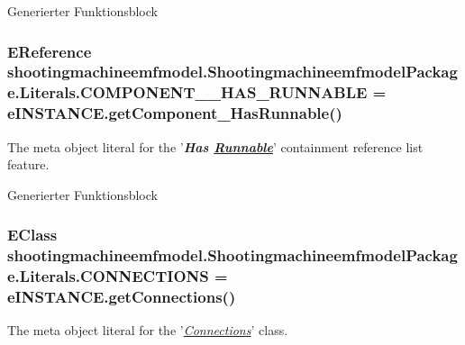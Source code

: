 Generierter Funktionsblock \hypertarget{interfaceshootingmachineemfmodel_1_1_shootingmachineemfmodel_package_1_1_literals_a20a06c9e56e70db80e097c0b1aa0a123}{
\subsubsection[{C\-O\-M\-P\-O\-N\-E\-N\-T\-\_\-\-\_\-\-H\-A\-S\-\_\-\-R\-U\-N\-N\-A\-B\-L\-E}]{\setlength{\rightskip}{0pt plus 5cm}E\-Reference shootingmachineemfmodel.\-Shootingmachineemfmodel\-Package.\-Literals.\-C\-O\-M\-P\-O\-N\-E\-N\-T\-\_\-\-\_\-\-H\-A\-S\-\_\-\-R\-U\-N\-N\-A\-B\-L\-E = e\-I\-N\-S\-T\-A\-N\-C\-E.\-get\-Component\-\_\-\-Has\-Runnable()}}\label{interfaceshootingmachineemfmodel_1_1_shootingmachineemfmodel_package_1_1_literals_a20a06c9e56e70db80e097c0b1aa0a123}
The meta object literal for the '{\itshape {\bfseries Has \hyperlink{interfaceshootingmachineemfmodel_1_1_runnable}{Runnable}}}' containment reference list feature.

Generierter Funktionsblock \hypertarget{interfaceshootingmachineemfmodel_1_1_shootingmachineemfmodel_package_1_1_literals_a9c8a1d573b9fd4d43bc01144a0a93f1f}{
\subsubsection[{C\-O\-N\-N\-E\-C\-T\-I\-O\-N\-S}]{\setlength{\rightskip}{0pt plus 5cm}E\-Class shootingmachineemfmodel.\-Shootingmachineemfmodel\-Package.\-Literals.\-C\-O\-N\-N\-E\-C\-T\-I\-O\-N\-S = e\-I\-N\-S\-T\-A\-N\-C\-E.\-get\-Connections()}}\label{interfaceshootingmachineemfmodel_1_1_shootingmachineemfmodel_package_1_1_literals_a9c8a1d573b9fd4d43bc01144a0a93f1f}
The meta object literal for the '\hyperlink{classshootingmachineemfmodel_1_1impl_1_1_connections_impl}{{\itshape Connections}}' class.

